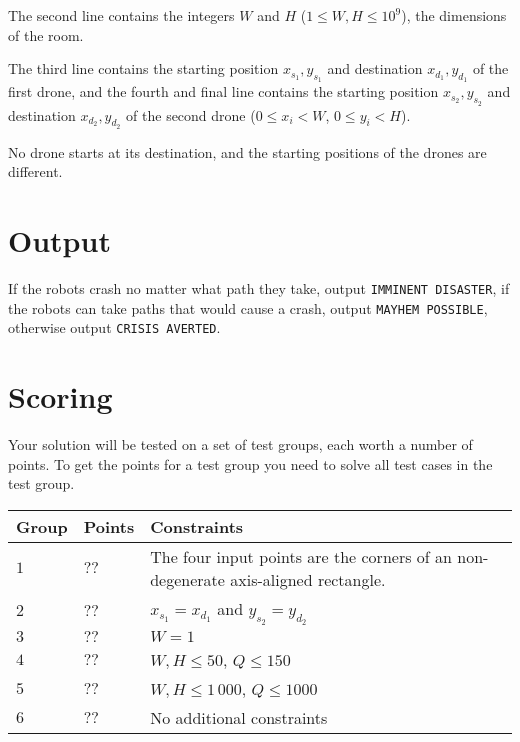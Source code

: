 The second line contains the integers $W$ and $H$ ($1 \le W, H \le 10^9$), the dimensions of the room.

The third line contains the starting position $x_{s_1}, y_{s_1}$ and destination $x_{d_1}, y_{d_1}$ of the first drone,
and the fourth and final line contains the starting position $x_{s_2}, y_{s_2}$ and destination $x_{d_2}, y_{d_2}$ of the second drone ($0 \le x_i < W$, $0 \le y_i < H$).

No drone starts at its destination, and the starting positions of the drones are different.

\section*{Output}
If the robots crash no matter what path they take, output \texttt{IMMINENT DISASTER},
if the robots can take paths that would cause a crash, output \texttt{MAYHEM POSSIBLE},
otherwise output \texttt{CRISIS AVERTED}.

\section*{Scoring}
Your solution will be tested on a set of test groups, each worth a number of points.
To get the points for a test group you need to solve all test cases in the test group.

\noindent
\begin{tabular}{| l | l | l |}
  \hline
  Group & Points & Constraints \\ \hline
  $1$    & $??$        &  The four input points are the corners of an non-degenerate axis-aligned rectangle. \\ \hline
  $2$    & $??$        &  $x_{s_1} = x_{d_1}$ and $y_{s_2} = y_{d_2}$ \\ \hline
  $3$    & $??$        &  $W = 1$ \\ \hline
  $4$    & $??$        &  $W, H \le 50$, $Q \le 150$ \\ \hline
  $5$    & $??$        &  $W, H \le 1\,000$, $Q \le 1000$ \\ \hline
  $6$    & $??$        &  No additional constraints \\ \hline
\end{tabular}
